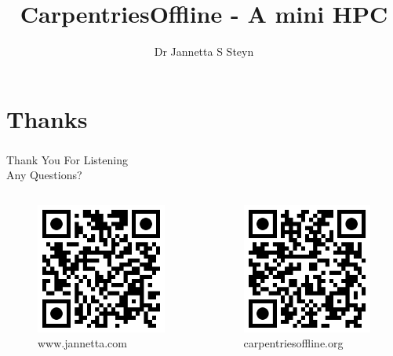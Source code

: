 \documentclass[aspectratio=169]{beamer}
\title{CarpentriesOffline - A mini HPC}
\author{
    Dr Jannetta S Steyn  
}
\institute{
    Newcastle University
}
\date{\shortdate{\formatdate{2025}{03}{27}}}
\begin{document}


\frame{\titlepage}



 







\section*{Thanks}
\begin{frame}
\frametitle{}
\centering\LARGE Thank You For Listening \\
\centering\LARGE Any Questions?
	\begin{columns}[b]
		\begin{column}[b]{.35\linewidth}
			\begin{figure}
				\includegraphics[width=.5\textwidth]{images/www.jannetta.com.png}
				\caption{www.jannetta.com}
			\end{figure}
		\end{column}
		\begin{column}[b]{.35\linewidth}
			\begin{figure}
				\includegraphics[width=.5\textwidth]{images/carpentriesoffline.org.png}
				\caption{carpentriesoffline.org}
			\end{figure}
		\end{column}
	\end{columns}
\end{frame}
\end{document}
